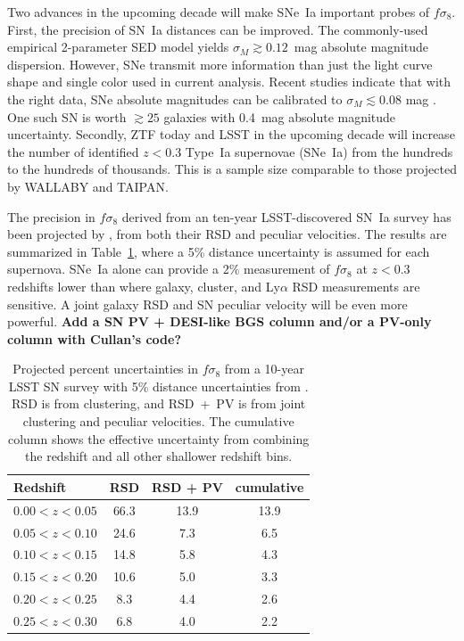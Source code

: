 \documentclass{aastex62}   	%
\begin{document}
Two advances in the upcoming decade will make SNe~Ia  important probes of $f\sigma_8$.
First, the precision of SN~Ia distances can be improved.  The commonly-used empirical 2-parameter SED model yields $\sigma_M \gtrsim 0.12$~mag absolute magnitude
dispersion.  However, SNe transmit more information than just the light curve shape and single color used in current analysis.
Recent studies indicate that with the right data, SNe absolute
magnitudes can be calibrated to $\sigma_M \lesssim 0.08$ mag \citep[see e.g.][]{2012MNRAS.425.1007B, 2015ApJ...815...58F}.
One such SN is worth $\gtrsim 25$ galaxies with 0.4~mag absolute magnitude uncertainty.
Secondly,  ZTF today and LSST in the upcoming decade will increase the number of identified  $z<0.3$ Type~Ia supernovae (SNe~Ia)  from the hundreds to the
hundreds of thousands.  This is a sample size comparable to those projected by WALLABY and TAIPAN.

The precision in  $f\sigma_8$ derived from an ten-year LSST-discovered  SN~Ia survey has been projected by \citet{2017ApJ...847..128H},
from both their RSD and peculiar velocities.
The results are summarized in Table~\ref{tab:howlett}, where a 5\% distance uncertainty is assumed for each supernova.
SNe~Ia alone can provide a $2\%$ measurement of $f\sigma_8$ at $z<0.3$ redshifts lower than where galaxy, cluster, and Ly$\alpha$
RSD measurements are sensitive.  A joint galaxy RSD and SN peculiar velocity will be even more powerful.
{\bf Add a SN PV + DESI-like BGS column and/or a PV-only column with Cullan's code? }

\begin{table}
   \centering
   \begin{tabular}{@{} lccc @{}} %
	\hline
	Redshift & RSD & RSD + PV & cumulative\\ \hline
      $0.00<z<0.05$   & 66.3 & 13.9 & 13.9\\
     $0.05<z<0.10$            & 24.6     &  7.3 & 6.5\\
     $0.10<z<0.15$      & 14.8  & 5.8 & 4.3\\
     $0.15<z<0.20$      & 10.6  & 5.0 & 3.3\\
      $0.20<z<0.25$     & 8.3  & 4.4 & 2.6\\
     $0.25<z<0.30$  & 6.8  &  4.0 & 2.2\\
      \hline
   \end{tabular}
   \caption{Projected percent uncertainties in $f\sigma_8$ from a 10-year LSST SN survey with 5\% distance uncertainties from
   \citet{2017ApJ...847..128H}. RSD is from clustering, and RSD~+~PV is from joint clustering and peculiar velocities.
   The cumulative column shows the effective uncertainty from combining the redshift and all other shallower redshift bins.}
   \label{tab:howlett}
\end{table}
\end{document}
